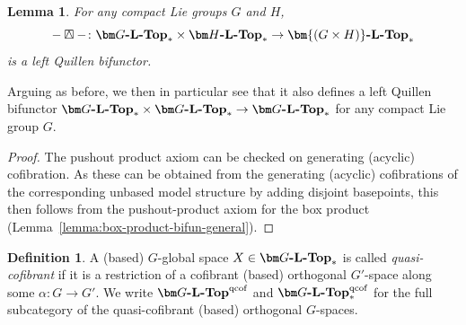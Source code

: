 \documentclass[reqno]{memo-l}
\theoremstyle{mythm}
\newtheorem{lemma}[thm]{Lemma}
\theoremstyle{definition}
\newtheorem{definition}[thm]{Definition}
\numberwithin{equation}{section}
\newcommand{\boxsmash}{\mathbin{\raise.5pt\hbox{\rlap{\lower.5pt\hbox{$\square$}}\kern.55pt$\smashp$\kern.55pt}}}
\newcommand{\cat}[1]{\textbf{\textup{#1}}}
\let\smashp=\wedge
\begin{document}
\begin{lemma}\label{lemma:boxsmash}
    For any compact Lie groups $G$ and $H$, 
    \[
        {-}\boxsmash{-}\colon\cat{$\bm G$-$\cat{L}$-Top}_*\times \cat{$\bm H$-$\cat{L}$-Top}_*\to\cat{$\bm{(G\times H)}$-$\cat{L}$-Top}_*
    \]
    is a left Quillen bifunctor.
\end{lemma}

Arguing as before, we then in particular see that it also defines a left Quillen bifunctor $\cat{$\bm G$-$\cat{L}$-Top}_*\times\cat{$\bm G$-$\cat{L}$-Top}_*\to\cat{$\bm G$-$\cat{L}$-Top}_*$ for any compact Lie group $G$.

\begin{proof}
    The pushout product axiom can be checked on generating (acyclic) cofibration. As these can be obtained from the generating (acyclic) cofibrations of the corresponding unbased model structure by adding disjoint basepoints, this then follows from the pushout-product axiom for the box product (Lemma~\ref{lemma:box-product-bifun-general}).
\end{proof}

\begin{definition}\label{defi:qcof}
    A (based) $G$-global space $X\in\cat{$\bm G$-$\cat{L}$-Top}_*$ is called \emph{quasi-cofibrant} if it is a restriction of a cofibrant (based) orthogonal $G'$-space along some $\alpha\colon G\to G'$. We write $\cat{$\bm G$-$\cat{L}$-Top}^\text{qcof}$ and $\cat{$\bm G$-$\cat{L}$-Top}^\text{qcof}_*$ for the full subcategory of the quasi-cofibrant (based) orthogonal $G$-spaces.
\end{definition}
\end{document}
